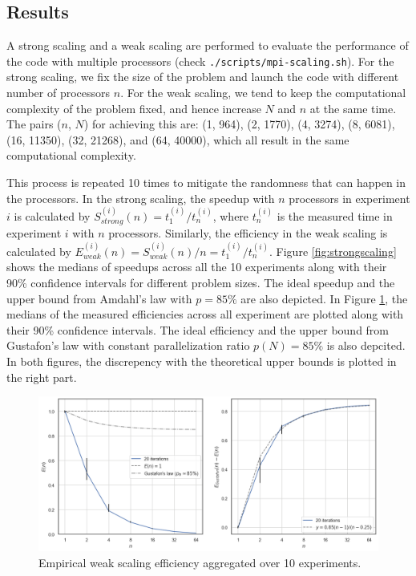\documentclass[10pt,journal,compsocconf]{IEEEtran}
\newcommand{\code}[1]{\texttt{#1}}
\begin{document}
\subsection{Results}

A strong scaling and a weak scaling are performed to evaluate the performance of the code with multiple processors (check \code{./scripts/mpi-scaling.sh}). For the strong scaling, we fix the size of the problem and launch the code with different number of processors $n$. For the weak scaling, we tend to keep the computational complexity of the problem fixed, and hence increase $N$ and $n$ at the same time. The pairs ($n$, $N$) for achieving this are: (1, 964), (2, 1770), (4, 3274), (8, 6081), (16, 11350), (32, 21268), and (64, 40000), which all result in the same computational complexity.

This process is repeated 10 times to mitigate the randomness that can happen in the processors. In the strong scaling, the speedup with $n$ processors in experiment $i$ is calculated by $S^{(i)}_{strong}(n) = t^{(i)}_1 / t^{(i)}_n$, where $t^{(i)}_n$ is the measured time in experiment $i$ with $n$ processors. Similarly, the efficiency in the weak scaling is calculated by $E^{(i)}_{weak}(n) = S^{(i)}_{weak}(n) / n = t^{(i)}_1 / t^{(i)}_n$. Figure \ref{fig:strongscaling} shows the medians of speedups across all the 10 experiments along with their 90\% confidence intervals for different problem sizes. The ideal speedup and the upper bound from Amdahl's law with $p=85\%$ are also depicted. In Figure \ref{fig:weakscaling}, the medians of the measured efficiencies across all experiment are plotted along with their 90\% confidence intervals. The ideal efficiency and the upper bound from Gustafon's law with constant parallelization ratio $p(N)=85\%$ is also depcited. In both figures, the discrepency with the theoretical upper bounds is plotted in the right part.


\begin{figure}[ht]
  \centering
  \includegraphics[width=.75\textwidth]{img/weakscaling.png}
  \caption{Empirical weak scaling efficiency aggregated over 10 experiments.}
  \label{fig:weakscaling}
\end{figure}
\end{document}

